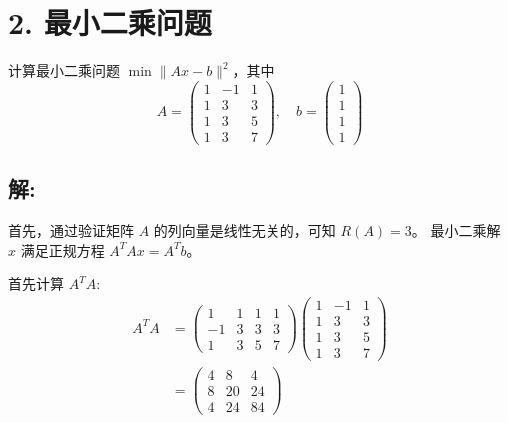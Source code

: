 \documentclass[12pt, a4paper]{article}
\begin{document}
\section*{2. 最小二乘问题}

计算最小二乘问题 $\min \|Ax-b\|^2$，其中
\[ A=\begin{pmatrix}
1 & -1 & 1 \\
1 & 3 & 3 \\
1 & 3 & 5 \\
1 & 3 & 7
\end{pmatrix}, \quad b=\begin{pmatrix}
1 \\
1 \\
1 \\
1
\end{pmatrix} \]

\subsection*{解:}
首先，通过验证矩阵 $A$ 的列向量是线性无关的，可知 $R(A)=3$。
最小二乘解 $\hat{x}$ 满足正规方程 $A^TAx = A^Tb$。

首先计算 $A^TA$:
\begin{align*}
A^TA &= \begin{pmatrix}
1 & 1 & 1 & 1 \\
-1 & 3 & 3 & 3 \\
1 & 3 & 5 & 7
\end{pmatrix}
\begin{pmatrix}
1 & -1 & 1 \\
1 & 3 & 3 \\
1 & 3 & 5 \\
1 & 3 & 7
\end{pmatrix} \\
&= \begin{pmatrix} %
4 & 8 & 4 \\
8 & 20 & 24 \\
4 & 24 & 84
\end{pmatrix}
\end{align*}
\end{document}
